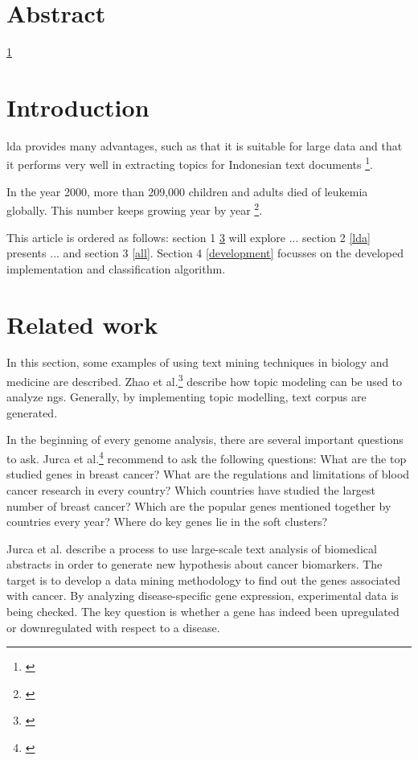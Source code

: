 





\chapter{Abstract}\label{abstract}
\ref{abstract}

\chapter{Introduction}\label{introduction}

\gls{lda} provides many advantages, such as that it is suitable for large data and that it performs very well in extracting topics for Indonesian text documents \footnote{\autocite{twinandilla_2018}}.

In the year 2000, more than 209,000 children and adults died of leukemia globally. This number keeps growing year by year \footnote{\autocite{tang}}.

This article is ordered as follows: section 1 \ref{related} will explore ...
section 2 \ref{lda} presents ... and section 3 \ref{all}. Section 4 \ref{development} focusses on the developed implementation and classification algorithm.

\chapter{Related work}\label{related}

In this section, some examples of using text mining techniques in biology and medicine are described.
Zhao et al.\footnote{\autocite{zhao_2016}} describe how topic modeling can be used to analyze \gls{ngs}. Generally, by implementing topic modelling, text corpus are generated.

In the beginning of every genome analysis, there are several important questions to ask. Jurca et al.\footnote{\autocite{jurca_2016}} recommend to ask the following questions: What are the top studied genes in breast cancer? What are the regulations and limitations of blood cancer research in every country? Which countries have studied the largest number of breast cancer? Which are the popular genes mentioned together by countries every year? Where do key genes lie in the soft clusters?

Jurca et al. describe a process to use large-scale text analysis of biomedical abstracts in order to generate new hypothesis about cancer biomarkers. The target is to develop a data mining methodology to find out the genes associated with cancer. By analyzing disease-specific gene expression, experimental data is being checked. The key question is whether a gene has indeed been upregulated or downregulated with respect to a disease.

